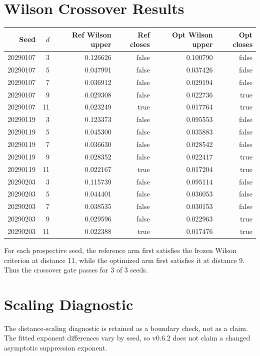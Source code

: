 \documentclass[11pt]{article}
\begin{document}
\section{Wilson Crossover Results}
\begin{center}
\scriptsize
\begin{tabular}{rrrrrr}
\toprule
Seed & $d$ & Ref Wilson upper & Ref closes & Opt Wilson upper & Opt closes \\
\midrule
20290107 & 3 & 0.126626 & false & 0.100790 & false \\
20290107 & 5 & 0.047991 & false & 0.037426 & false \\
20290107 & 7 & 0.036912 & false & 0.029194 & false \\
20290107 & 9 & 0.029308 & false & 0.022736 & true \\
20290107 & 11 & 0.023249 & true & 0.017764 & true \\
20290119 & 3 & 0.123373 & false & 0.095553 & false \\
20290119 & 5 & 0.045300 & false & 0.035883 & false \\
20290119 & 7 & 0.036630 & false & 0.028542 & false \\
20290119 & 9 & 0.028352 & false & 0.022417 & true \\
20290119 & 11 & 0.022167 & true & 0.017204 & true \\
20290203 & 3 & 0.115739 & false & 0.095114 & false \\
20290203 & 5 & 0.044401 & false & 0.036053 & false \\
20290203 & 7 & 0.038535 & false & 0.030153 & false \\
20290203 & 9 & 0.029596 & false & 0.022963 & true \\
20290203 & 11 & 0.022388 & true & 0.017476 & true \\
\bottomrule
\end{tabular}
\end{center}

For each prospective seed, the reference arm first satisfies the frozen Wilson criterion at distance 11, while the optimized arm first satisfies it at distance 9. Thus the crossover gate passes for 3 of 3 seeds.

\section{Scaling Diagnostic}
The distance-scaling diagnostic is retained as a boundary check, not as a claim. The fitted exponent differences vary by seed, so v0.6.2 does not claim a changed asymptotic suppression exponent.
\end{document}
